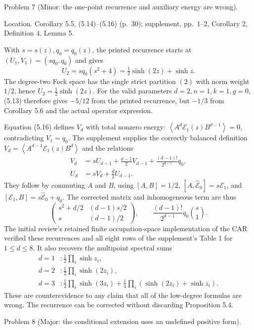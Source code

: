 \documentclass[10pt]{article}
\begin{document}
Problem 7 (Minor: the one-point recurrence and auxiliary energy are wrong).\par
Location. Corollary 5.5, (5.14)–(5.16) (p. 30); supplement, pp. 1–2, Corollary 2, Definition 4, Lemma 5.\par
With \(s=s(z),q_0=q_0(z)\), the printed recurrence starts at \((U_1,V_1)=(sq_0,q_0)\) and gives \[U_2=sq_0(s^2+4)=\tfrac12\sinh(2z)+\sinh z.\] The degree-two Fock space has the single strict partition \((2)\) with norm weight \(1/2\), hence \(U_2=\tfrac12\sinh(2z)\). For the valid parameters \(d=2,n=1,k=1,g=0\), (5.13) therefore gives \(-5/12\) from the printed recurrence, but \(-1/3\) from Corollary 5.6 and the actual operator expression.\par
Equation (5.16) defines \(V_d\) with total nonzero energy: \(\left\langle A^d\mathcal E_1(z)B^{d-1}\right\rangle=0\), contradicting \(V_1=q_0\). The supplement supplies the correctly balanced definition \(V_d=\left\langle A^{d-1}\mathcal E_1(z)B^d\right\rangle\) and the relations \[\begin{split}
 V_d&=sU_{d-1}+\frac{d-1}{2}V_{d-1}
       +\frac{(d-1)!}{2^{d-1}}q_0,\\
 U_d&=sV_d+\frac d2 U_{d-1}.
 \end{split}\] They follow by commuting \(A\) and \(B\), using \([A,B]=1/2\), \([A,\widehat{\mathcal E}_0]=s\mathcal E_1\), and \([\mathcal E_1,B]=s\widehat{\mathcal E}_0+q_0\). The corrected matrix and inhomogeneous term are thus \[\begin{pmatrix}s^2+d/2&(d-1)s/2\\s&(d-1)/2\end{pmatrix},
 \qquad
 \frac{(d-1)!}{2^{d-1}}q_0\binom{s}{1}.\] The initial review’s retained finite occupation-space implementation of the CAR verified these recurrences and all eight rows of the supplement’s Table 1 for \(1\leq d\leq8\). It also recovers the multipoint spectral sums \[\begin{split}
 d=1 &: \tfrac12\prod_i\sinh z_i,\\
 d=2 &: \tfrac12\prod_i\sinh(2z_i),\\
 d=3 &: \tfrac12\prod_i\sinh(3z_i)
       +\tfrac14\prod_i(\sinh(2z_i)+\sinh z_i).
 \end{split}\] These are counterevidence to any claim that all of the low-degree formulas are wrong. The recurrence can be corrected without discarding Proposition 5.4.\par
Problem 8 (Major: the conditional extension uses an undefined positive form).\par
\end{document}
